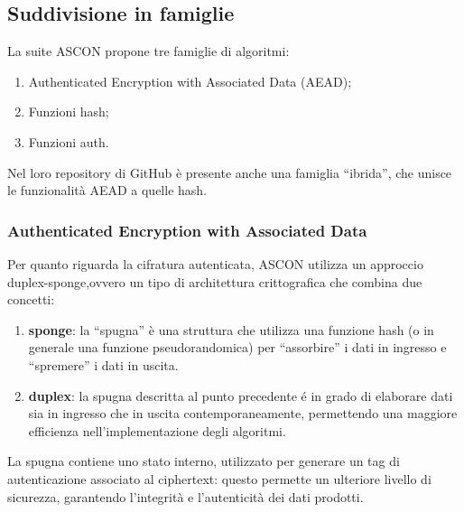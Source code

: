 \subsection{Suddivisione in famiglie}

La suite ASCON propone tre famiglie di algoritmi: \begin{enumerate}
    \item Authenticated Encryption with Associated Data (AEAD);
    \item Funzioni hash;
    \item Funzioni auth.
\end{enumerate}
Nel loro repository di GitHub\cite{github} è presente anche una famiglia ``ibrida'', che unisce le funzionalità AEAD a quelle hash.

\subsubsection{Authenticated Encryption with Associated Data}

Per quanto riguarda la cifratura autenticata, ASCON utilizza un approccio duplex-sponge\cite{ascon-specification},ovvero un tipo di architettura crittografica che combina due concetti:
\begin{enumerate}[label=\Roman*.]
    \item \textbf{sponge}: la ``spugna'' è una struttura che utilizza una funzione hash (o in generale una funzione pseudorandomica) per ``assorbire'' i dati in ingresso e ``spremere'' i dati in uscita.
    \item \textbf{duplex}: la spugna descritta al punto precedente é in grado di elaborare dati sia in ingresso che in uscita contemporaneamente, permettendo una maggiore efficienza nell'implementazione degli algoritmi.
\end{enumerate}
La spugna contiene uno stato interno, utilizzato per generare un tag di autenticazione associato al ciphertext: questo permette un ulteriore livello di sicurezza, garantendo l'integrità e l'autenticità dei dati prodotti. \\

